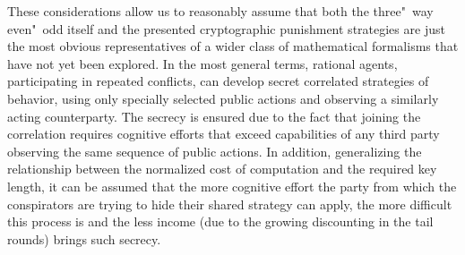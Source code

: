 These considerations allow us to reasonably assume that both the three"~way even"~odd itself and the presented cryptographic punishment strategies are just the most obvious representatives of a wider class of mathematical formalisms that have not yet been explored. In the most general terms, rational agents, participating in repeated conflicts, can develop secret correlated strategies of behavior, using only specially selected public actions and observing a similarly acting counterparty. The secrecy is ensured due to the fact that joining the correlation requires cognitive efforts that exceed capabilities of any third party observing the same sequence of public actions. In addition, generalizing the relationship between the normalized cost of computation and the required key length, it can be assumed that the more cognitive effort the party from which the conspirators are trying to hide their shared strategy can apply, the more difficult this process is and the less income (due to the growing discounting in the tail rounds) brings such secrecy. %

